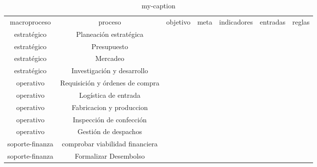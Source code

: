 \begin{table}[]
\centering
\caption{my-caption}
\label{my-label}
\begin{tabular}{ccccccc}
macroproceso   &               proceso                             &                                    objetivo&        meta&    indicadores&           entradas &         reglas\\
estratégico   &               Planeación estratégica            &                                            &            &               &                    &         \\
estratégico   &               Presupuesto                         &                                            &            &               &                    &         \\
estratégico   &               Mercadeo                            &                                            &            &               &                    &         \\
estratégico   &               Investigación y desarrollo         &                                            &            &               &                    &         \\
operativo      &               Requisición y órdenes de compra   &                                            &            &               &                    &         \\
operativo      &               Logística de entrada               &                                            &            &               &                    &         \\
operativo      &               Fabricacion y produccion            &                                            &            &               &                    &         \\
operativo      &               Inspección de confección          &                                            &            &               &                    &         \\
operativo      &               Gestión de despachos               &                                            &            &               &                    &         \\
soporte-finanza&               comprobar viabilidad financiera     &                                            &            &               &                    &         \\
soporte-finanza&               Formalizar Desembolso               &                                            &            &               &                    &         \\

\end{tabular}
\end{table}
